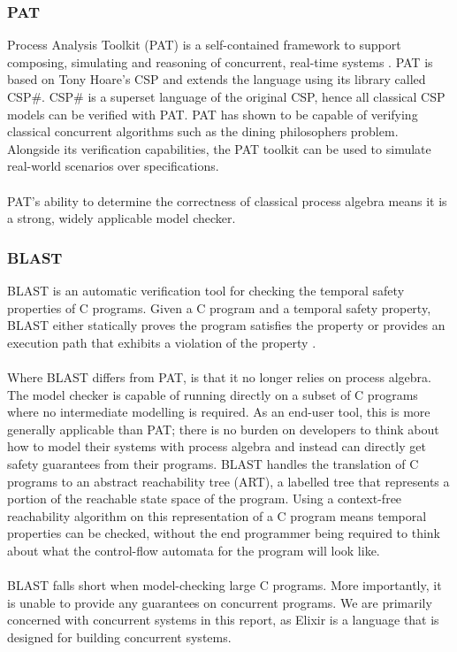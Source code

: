 \subsubsection*{\textbf{PAT}}
Process Analysis Toolkit (PAT) is a self-contained framework to support composing, simulating and reasoning of concurrent, real-time systems \cite{pat}. PAT is based on Tony Hoare's CSP and extends the language using its library called CSP\#. CSP\# is a superset language of the original CSP, hence all classical CSP models can be verified with PAT. PAT has shown to be capable of verifying classical concurrent algorithms such as the dining philosophers problem. Alongside its verification capabilities, the PAT toolkit can be used to simulate real-world scenarios over specifications. 
\\ \\
PAT's ability to determine the correctness of classical process algebra means it is a strong, widely applicable model checker.

\subsubsection*{\textbf{BLAST}}
BLAST is an automatic verification tool for checking the temporal safety properties of C programs. Given a C program and a temporal safety property, BLAST either statically proves the program satisfies the property or provides an execution path that exhibits a violation of the property \cite{blast}.
\\ \\
Where BLAST differs from PAT, is that it no longer relies on process algebra. The model checker is capable of running directly on a subset of C programs where no intermediate modelling is required. As an end-user tool, this is more generally applicable than PAT; there is no burden on developers to think about how to model their systems with process algebra and instead can directly get safety guarantees from their programs. BLAST handles the translation of C programs to an abstract reachability tree (ART), a labelled tree that represents a portion of the reachable state space of the program. Using a context-free reachability algorithm on this representation of a C program means temporal properties can be checked, without the end programmer being required to think about what the control-flow automata for the program will look like.
\\ \\
BLAST falls short when model-checking large C programs. More importantly, it is unable to provide any guarantees on concurrent programs. We are primarily concerned with concurrent systems in this report, as Elixir is a language that is designed for building concurrent systems.

